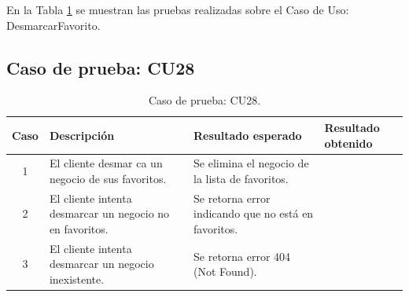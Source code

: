 
En la Tabla \ref{tab:cu28_white_test} se muestran las pruebas realizadas sobre el Caso de Uso: DesmarcarFavorito.

\subsection{Caso de prueba: CU28}

\begin{table}[H]
\centering
\label{tab:cu28_white_test}
\renewcommand{\arraystretch}{1.3}
\begin{tabular}{|c|p{5cm}|p{6cm}|p{2.5cm}|}
\hline
\rowcolor[RGB]{217,217,217}
\textbf{Caso} & \textbf{Descripción} & \textbf{Resultado esperado} & \textbf{Resultado obtenido} \\
\hline

1 &
El cliente desmar
ca un negocio de sus favoritos. &
Se elimina el negocio de la lista de favoritos. &
 \\
\hline

2 &
El cliente intenta desmarcar un negocio no en favoritos. &
Se retorna error indicando que no está en favoritos. &
 \\
\hline

3 &
El cliente intenta desmarcar un negocio inexistente. &
Se retorna error 404 (Not Found). &
 \\
\hline

\end{tabular}
\caption{Caso de prueba: CU28.}
\label{tab:cu28_white_test}
\end{table}
